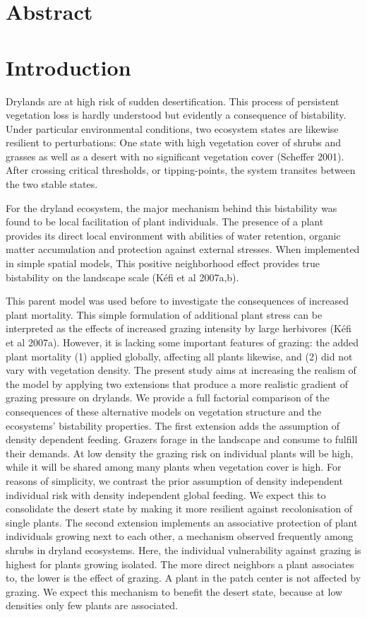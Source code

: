 
\section{Abstract}


\section{Introduction}

Drylands are at high risk of sudden desertification. This process of persistent vegetation loss is hardly understood but evidently a consequence of bistability. Under particular environmental conditions, two ecosystem states are likewise resilient to perturbations: One state with high vegetation cover of shrubs and grasses as well as a desert with no significant vegetation cover (Scheffer 2001). After crossing critical thresholds, or tipping-points, the system transites between the two stable states. 

For the dryland ecosystem, the major mechanism behind this bistability was found to be local facilitation of plant individuals. The presence of a plant provides its direct local environment with abilities of water retention, organic matter accumulation and protection against external stresses. When implemented in simple spatial models, This positive neighborhood effect provides true bistability on the landscape scale (K\'efi et al 2007a,b). 

This parent model was used before to investigate the consequences of increased plant mortality. This simple formulation of additional plant stress can be interpreted as the effects of increased grazing intensity by large herbivores (K\'efi et al 2007a). However, it is lacking some important features of grazing: the added plant mortality (1) applied globally, affecting all plants likewise, and (2) did not vary with vegetation density. The present study aims at increasing the realism of the model by applying two extensions that produce a more realistic gradient of grazing pressure on drylands. We provide a full factorial comparison of the consequences of these alternative models on vegetation structure and the ecosystems' bistability properties. The first extension adds the assumption of density dependent feeding. Grazers forage in the landscape and consume to fulfill their demands. At low density the grazing risk on individual plants will be high, while it will be shared among many plants when vegetation cover is high. For reasons of simplicity, we contrast the prior assumption of density independent individual risk with density independent global feeding. We expect this to consolidate the desert state by making it more resilient against recolonisation of single plants. The second extension implements an associative protection of plant individuals growing next to each other, a mechanism observed frequently among shrubs in dryland ecosystems. Here, the individual vulnerability against grazing is highest for plants growing isolated. The more direct neighbors a plant associates to, the lower is the effect of grazing. A plant in the patch center is not affected by grazing. We expect this mechanism to benefit the desert state, because at low densities only few plants are associated.




